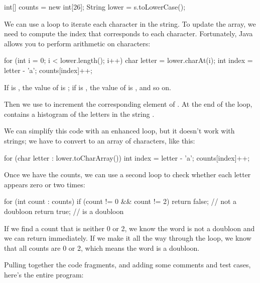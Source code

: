 \begin{code}
int[] counts = new int[26];
String lower = s.toLowerCase();
\end{code}

We can use a  loop to iterate each character in the string.
To update the  array, we need to compute the index that corresponds to each character.
Fortunately, Java allows you to perform arithmetic on characters:

\begin{code}
for (int i = 0; i < lower.length(); i++) {
    char letter = lower.charAt(i);
    int index = letter - 'a';
    counts[index]++;
}
\end{code}

If  is , the value of  is ;
if  is , the value of  is ,
and so on.

Then we use  to increment the corresponding element of .
At the end of the loop,  contains a histogram of the letters in the string .


We can simplify this code with an enhanced  loop, but it doesn't work with strings; we have to convert  to an array of characters, like this:

\begin{code}
for (char letter : lower.toCharArray()) {
    int index = letter - 'a';
    counts[index]++;
}
\end{code}

Once we have the counts, we can use a second  loop to check whether each letter appears zero or two times:

\begin{code}
for (int count : counts) {
    if (count != 0 && count != 2) {
        return false;  // not a doubloon
    }
}
return true;  // is a doubloon
\end{code}

If we find a count that is neither 0 or 2, we know the word is not a doubloon and we can return immediately.
If we make it all the way through the  loop, we know that all counts are 0 or 2, which means the word is a doubloon.

Pulling together the code fragments, and adding some comments and test cases, here's the entire program:


